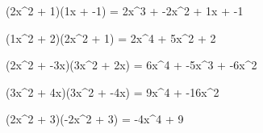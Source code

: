 \nextt
\begin{console}[commandchars=\\\{\}]
(2x^2 + 1)(1x + -1) = 2x^3 + -2x^2 + 1x + -1
\end{console}

\nextt
\begin{console}[commandchars=\\\{\}]
(1x^2 + 2)(2x^2 + 1) = 2x^4 + 5x^2 + 2
\end{console}

\nextt
\begin{console}[commandchars=\\\{\}]
(2x^2 + -3x)(3x^2 + 2x) = 6x^4 + -5x^3 + -6x^2
\end{console}

\nextt
\begin{console}[commandchars=\\\{\}]
(3x^2 + 4x)(3x^2 + -4x) = 9x^4 + -16x^2
\end{console}

\nextt
\begin{console}[commandchars=\\\{\}]
(2x^2 + 3)(-2x^2 + 3) = -4x^4 + 9
\end{console}
